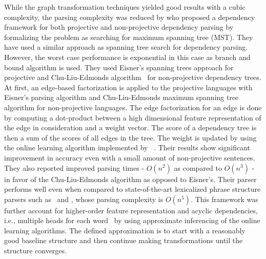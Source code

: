 While the graph transformation techniques yielded good results with a cubic complexity, the parsing complexity was reduced by \cite{McDonald:2005:NDP:1220575.1220641} who proposed a dependency framework for both projective and non-projective dependency parsing by formalizing the problem as searching for maximum spanning tree (MST). They have used a similar approach as \cite{hirakawa2001semantic} spanning tree search for dependency parsing. However, the worst case performance is exponential in this case as branch and bound algorithm is used. They used Eisner's spanning trees approach for projective and Chu-Liu-Edmonds algorithm~\citep{chu1965shortest,edmonds1967optimum} for non-projective dependency trees. At first, an edge-based factorization is applied to the projective languages with Eisner's parsing algorithm and Chu-Liu-Edmonds maximum spanning tree algorithm for non-projective languages. The edge factorization for an edge is done by computing a dot-product between a high dimensional feature representation of the edge in consideration and a weight vector. The score of a dependency tree is then a sum of the scores of all edges in the tree. The weight is updated by using the online learning algorithm implemented by
~\cite{McDonald:2005:OLT:1219840.1219852}. Their results show significant improvement in accuracy even with a small amount of non-projective sentences. They also reported improved parsing times - $O(n^2)$ as compared to $O(n^3)$ - in favor of the Chu-Liu-Edmonds algorithm as opposed to Eisner's. Their parser performs well even when compared to state-of-the-art lexicalized phrase structure parsers such as~\cite{collins1999statistical} and \cite{zeman2004parsing}, whose parsing complexity is $O(n^5)$. This framework was further account for higher-order feature representation and acyclic dependencies, i.e., multiple heads for each word~\citep{mcdonald2006online} by using approximate inferencing of the online learning algorithms. The defined approximation is to start with a reasonably good baseline structure and then continue making transformations until the structure converges. 

